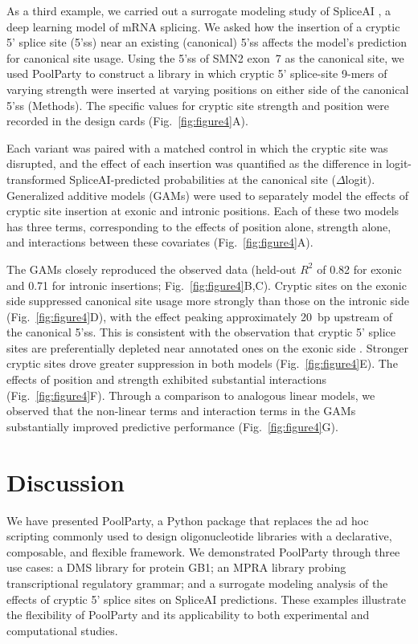 \documentclass[twoside]{kinney_lab_preprintstyle}
\begin{document}
As a third example, we carried out a surrogate modeling study of SpliceAI \citep{Jaganathan2019ps}, a deep learning model of mRNA splicing. We asked how the insertion of a cryptic 5' splice site (5'ss) near an existing (canonical) 5'ss affects the model's prediction for canonical site usage. Using the 5'ss of SMN2 exon~7 as the canonical site, we used PoolParty to construct a library in which cryptic 5' splice-site 9-mers of varying strength were inserted at varying positions on either side of the canonical 5'ss (Methods). The specific values for cryptic site strength and position were recorded in the design cards (Fig.~\ref{fig:figure4}A).

Each variant was paired with a matched control in which the cryptic site was disrupted, and the effect of each insertion was quantified as the difference in logit-transformed SpliceAI-predicted probabilities at the canonical site ($\Delta$logit). Generalized additive models (GAMs) were used to separately model the effects of cryptic site insertion at exonic and intronic positions. Each of these two models has three terms, corresponding to the effects of position alone, strength alone, and interactions between these covariates (Fig.~\ref{fig:figure4}A).

The GAMs closely reproduced the observed data (held-out $R^2$ of 0.82 for exonic and 0.71 for intronic insertions; Fig.~\ref{fig:figure4}B,C). Cryptic sites on the exonic side suppressed canonical site usage more strongly than those on the intronic side (Fig.~\ref{fig:figure4}D), with the effect peaking approximately 20~bp upstream of the canonical 5'ss. This is consistent with the observation that cryptic 5' splice sites are preferentially depleted near annotated ones on the exonic side \citep{Dawes2022empirical}. Stronger cryptic sites drove greater suppression in both models (Fig.~\ref{fig:figure4}E). The effects of position and strength exhibited substantial interactions (Fig.~\ref{fig:figure4}F). Through a comparison to analogous linear models, we observed that the non-linear terms and interaction terms in the GAMs substantially improved predictive performance (Fig.~\ref{fig:figure4}G).

\section*{Discussion}

We have presented PoolParty, a Python package that replaces the ad hoc scripting commonly used to design oligonucleotide libraries with a declarative, composable, and flexible framework. We demonstrated PoolParty through three use cases: a DMS library for protein GB1; an MPRA library probing transcriptional regulatory grammar; and a surrogate modeling analysis of the effects of cryptic 5' splice sites on SpliceAI predictions. These examples illustrate the flexibility of PoolParty and its applicability to both experimental and computational studies.
\end{document}
